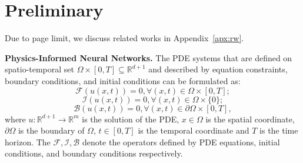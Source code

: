 \section{Preliminary}
Due to page limit, we discuss related works in Appendix~\ref{apx:rw}.


\textbf{Physics-Informed Neural Networks.}
The PDE systems that are defined on spatio-temporal set $\Omega \times [0,T] \subseteq  \mathbb R^{d+1}$ and described by equation constraints, boundary conditions, and initial conditions can be formulated as:
\vspace{-2mm}
\begin{equation}
    \mathcal F(u(x,t)) = 0,\forall (x,t)\in\Omega\times[0,T];
\end{equation}
\begin{equation}
    \mathcal I(u(x,t)) = 0,\forall (x,t)\in\Omega\times\{0\};
\end{equation}
\begin{equation}
    \mathcal B(u(x,t)) = 0,\forall (x,t)\in\partial\Omega\times [0,T],
\end{equation}
where $u:\mathbb R^{d+1}\rightarrow \mathbb R^m$ is the solution of the PDE, $x\in\Omega$ is the spatial coordinate, $\partial\Omega$ is the boundary of $\Omega$, $t \in [0,T]$ is the temporal coordinate and $T$ is the time horizon. The
$\mathcal F,\mathcal I, \mathcal B$ denote the operators defined by PDE equations, initial conditions, and boundary conditions respectively.

